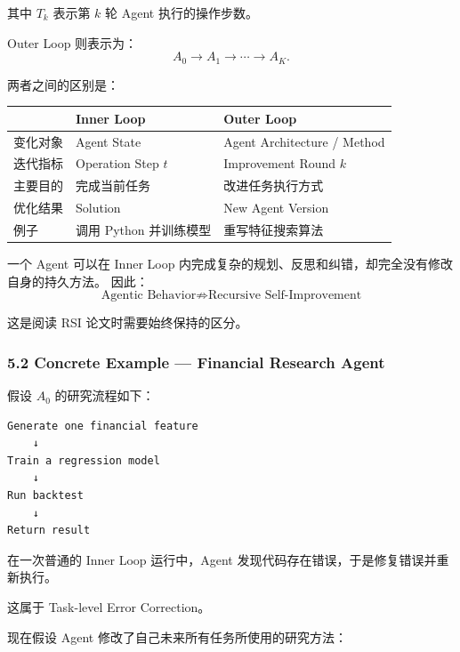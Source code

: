其中 \(T_k\) 表示第 \(k\) 轮 Agent 执行的操作步数。

Outer Loop 则表示为：
\[A_0\rightarrow A_1
\rightarrow\cdots\rightarrow A_K.\]

两者之间的区别是：

\begin{readertable}
\begin{longtable}[]{@{}
  >{\raggedright\arraybackslash}p{}
  >{\raggedright\arraybackslash}p{}
  >{\raggedright\arraybackslash}p{}@{}}
\toprule
& Inner Loop & Outer Loop \\
\midrule
\endhead
变化对象 & Agent State & Agent Architecture / Method \\
迭代指标 & Operation Step \(t\) & Improvement Round \(k\) \\
主要目的 & 完成当前任务 & 改进任务执行方式 \\
优化结果 & Solution & New Agent Version \\
例子 & 调用 Python 并训练模型 & 重写特征搜索算法 \\
\bottomrule
\end{longtable}
\end{readertable}

一个 Agent 可以在 Inner Loop 内完成复杂的规划、反思和纠错，却完全没有修改自身的持久方法。 因此：
\[\boxed{
\text{Agentic Behavior}
\not\Rightarrow
\text{Recursive Self-Improvement}
}\]

这是阅读 RSI 论文时需要始终保持的区分。

\hypertarget{part-3-31-0001-concrete-example-financial-research-agent}{%
\subsubsection{5.2 Concrete Example --- Financial Research Agent}\label{part-3-31-0001-concrete-example-financial-research-agent}}

假设 \(A_0\) 的研究流程如下：

\begin{verbatim}
Generate one financial feature
    ↓
Train a regression model
    ↓
Run backtest
    ↓
Return result
\end{verbatim}

在一次普通的 Inner Loop 运行中，Agent 发现代码存在错误，于是修复错误并重新执行。

这属于 Task-level Error Correction。

现在假设 Agent 修改了自己未来所有任务所使用的研究方法：

